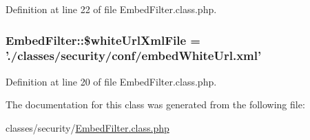 Definition at line 22 of file Embed\-Filter.\-class.\-php.

\hypertarget{classEmbedFilter_aad143e16d225c65d096f44b325744c89}{
\subsubsection[{\$white\-Url\-Xml\-File}]{\setlength{\rightskip}{0pt plus 5cm}Embed\-Filter\-::\$white\-Url\-Xml\-File = './classes/security/conf/embed\-White\-Url.\-xml'}}\label{classEmbedFilter_aad143e16d225c65d096f44b325744c89}


Definition at line 20 of file Embed\-Filter.\-class.\-php.



The documentation for this class was generated from the following file\-:\begin{DoxyCompactItemize}
\item 
classes/security/\hyperlink{EmbedFilter_8class_8php}{Embed\-Filter.\-class.\-php}\end{DoxyCompactItemize}
